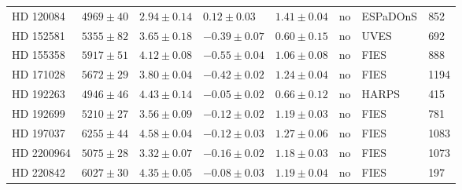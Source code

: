 \documentclass{aa}
\begin{document}
\begin{table}[htb!]
\begin{tabular}{llllllll}
    HD 120084     &  $4969 \pm  40$      &  $2.94 \pm 0.14$    &  $ 0.12 \pm 0.03$    &  $1.41 \pm 0.04$             &             no              & ESPaDOnS     &  852  \\  %
    HD 152581     &  $5355 \pm  82$      &  $3.65 \pm 0.18$    &  $-0.39 \pm 0.07$    &  $0.60 \pm 0.15$             &             no              & UVES         &  692  \\  %
    HD 155358     &  $5917 \pm  51$      &  $4.12 \pm 0.08$    &  $-0.55 \pm 0.04$    &  $1.06 \pm 0.08$             &             no              & FIES         &  888  \\  %
    HD 171028     &  $5672 \pm  29$      &  $3.80 \pm 0.04$	   &  $-0.42 \pm 0.02$    &  $1.24 \pm 0.04$             &             no              & FIES         & 1194  \\
    HD 192263     &  $4946 \pm  46$      &  $4.43 \pm 0.14$    &  $-0.05 \pm 0.02$    &  $0.66 \pm 0.12$             &             no              & HARPS        &  415  \\  %
    HD 192699     &  $5210 \pm  27$      &  $3.56 \pm 0.09$	   &  $-0.12 \pm 0.02$    &  $1.19 \pm 0.03$             &             no              & FIES         &  781  \\
    HD 197037     &  $6255 \pm  44$      &  $4.58 \pm 0.04$	   &  $-0.12 \pm 0.03$    &  $1.27 \pm 0.06$             &             no              & FIES         & 1083  \\
   HD 2200964     &  $5075 \pm  28$      &  $3.32 \pm 0.07$	   &  $-0.16 \pm 0.02$    &  $1.18 \pm 0.03$             &             no              & FIES         & 1073  \\
    HD 220842     &  $6027 \pm  30$      &  $4.35 \pm 0.05$    &  $-0.08 \pm 0.03$    &  $1.19 \pm 0.04$             &             no              & FIES         &  197  \\  %

\end{tabular}
\end{table}
\end{document}
